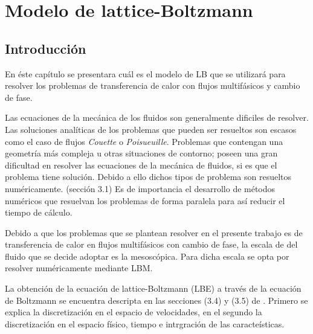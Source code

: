 \chapter{Modelo de lattice-Boltzmann}
\graphicspath{{figs/cap3/}}
\label{cap3}

\section{Introducción}

En éste capítulo se presentara cuál es el modelo de LB que se utilizará para resolver
los problemas de transferencia de calor con flujos multifásicos y cambio de fase.

Las ecuaciones de la mecánica de los fluidos son generalmente dificiles de resolver. 
Las soluciones analíticas de los problemas que pueden ser resueltos son escasos como el caso de flujos \textit{Couette} o \textit{Poisueuille}.
Problemas que contengan una geometría más compleja u otras situaciones de contorno; poseen 
una gran dificultad en resolver las ecuaciones de la mecánica de fluidos, si es que el problema tiene solución.
Debido a ello dichos tipos de problema son resueltos numéricamente. \cite{kruger2017lattice}(sección 3.1) 
Es de importancia el desarrollo de métodos numéricos que resuelvan los problemas 
de forma paralela para así reducir el tiempo de cálculo.

Debido a que los problemas que se plantean resolver en el presente trabajo es de transferencia de calor 
en flujos multifásicos con cambio de fase, la escala de del fluido que se decide adoptar es la mesoscópica.
Para dicha escala se opta por resolver numéricamente mediante LBM. 

La obtención de la ecuación de lattice-Boltzmann (LBE) a través de la ecuación de Boltzmann se encuentra descripta
en las secciones (3.4) y (3.5) de  \cite{kruger2017lattice}. Primero se explica la discretización en el espacio de velocidades, en el segundo la 
discretización en el espacio físico, tiempo e intrgración de las caracteísticas.


